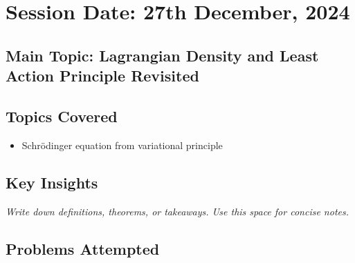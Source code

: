 \section{Session Date: 27th December, 2024}
\subsection*{Main Topic: Lagrangian Density and Least Action Principle Revisited}
\subsection*{Topics Covered}
\begin{itemize}
    \item Schrödinger equation from variational principle
\end{itemize}

\subsection*{Key Insights}
\textit{Write down definitions, theorems, or takeaways. Use this space for concise notes.}

\subsection*{Problems Attempted}
